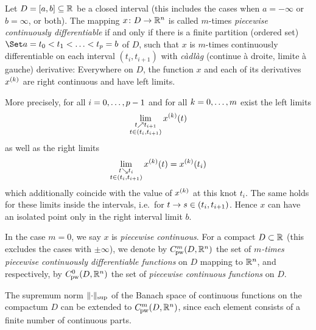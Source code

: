     \begin{definition}
    \label{def:pw-cont-diff}
        Let $D=[a,b]\subseteq\mathbb{R}$ be a closed interval (this includes the cases when $a=-\infty$ or $b=\infty$, or both). The mapping $x\colon D\to\mathbb{R}^n$ is called $m$-times \emph{piecewise continuously differentiable} if and only if there is a finite partition (ordered set) $\partition[t_1]{a=t_0}{t_p=b}$ of $D$, such that $x$ is $m$-times continuously differentiable on each interval $(t_i,t_{i+1})$ with \foreignlanguage{frenchb}{\emph{càdlàg} (\og continue à droite, limite à gauche\fg{})} derivative:
        Everywhere on $D$, the function $x$ and each of its derivatives $\D[k]{x}$ are right continuous and have left limits.

        More precisely, for all $i=0,\ldots,p-1$ and for all $k=0,\ldots,m$ exist the left limits
        \begin{equation}\label{eq:left-limit}
            \lim_{\substack{t\upto t_{i+1}\\ t\in(t_i,t_{i+1})}} \D[k]{x}(t)
        \end{equation}
        as well as the right limits
        \begin{equation}\label{eq:right-limit}
            \lim_{\substack{t\downto t_{i}\\ t\in(t_i,t_{i+1})}} \D[k]{x}(t) = \D[k]{x}(t_i)
        \end{equation}
        which additionally coincide with the value of $\D[k]{x}$ at this knot $t_i$.
        The same holds for these limits inside the intervals, i.e.\ for $t\to s\in(t_i,t_{i+1})$.
        Hence $x$ can have an isolated point only in the right interval limit $b$.

        In the case $m=0$, we say $x$ is \emph{piecewise continuous}.
        For a compact $D\subset\mathbb{R}$ (this excludes the cases with $\pm\infty$), we denote by $\Cnpw[m]{D}{\R^n}$ the set of \emph{$m$-times piecewise continuously differentiable functions} on $D$ mapping to $\mathbb{R}^n$, and respectively, by $\Cnpw[0]{D}{\R^n}$ the set of \emph{piecewise continuous functions} on $D$.

        The supremum norm $\lVert\cdot\rVert_{\sup}$ of the Banach space of continuous functions on the compactum $D$ can be extended to $\Cnpw[m]{D}{\R^n}$, since each element consists of a finite number of continuous parts.
    \end{definition}

